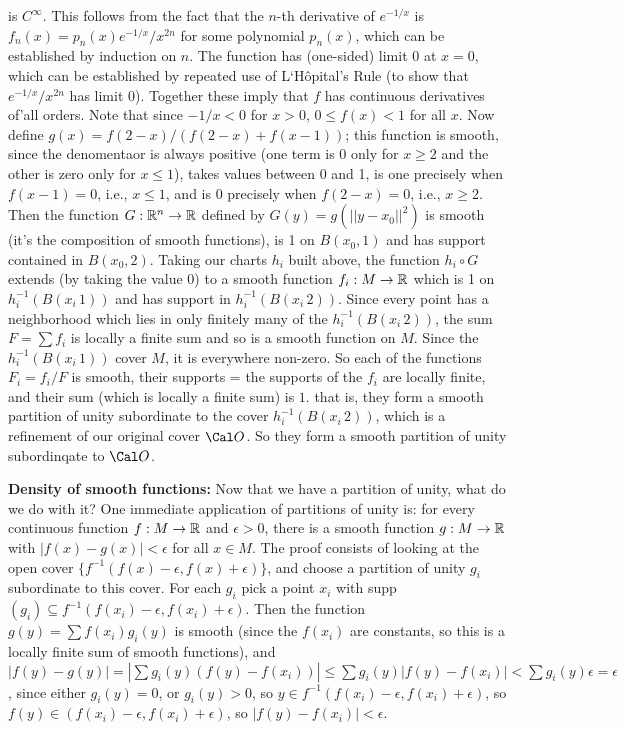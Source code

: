 
\noindent is $C^\infty$. This follows from the fact that the $n$-th derivative of
$e^{-1/x}$ is $f_n(x)=p_n(x)e^{-1/x}/x^{2n}$ for some polynomial $p_n(x)$, which can be established
by induction on $n$. The function has (one-sided) limit $0$ at $x=0$, which can be established by
repeated use of L`H\^opital's Rule (to show that $e^{-1/x}/x^{2n}$ has limit 0). 
Together these imply that $f$ has continuous derivatives of'all orders. Note that since
$-1/x<0$ for $x>0$, $0\leq f(x) <1$ for all $x$. Now define 
$g(x)=f(2-x)/(f(2-x)+f(x-1))$; this function is smooth, since the denomentaor is always positive
(one term is 0 only for $x\geq 2$ and the other is zero only for $x\leq 1$), takes values
between 0 and 1, is one precisely when $f(x-1)=0$, i.e., $x\leq 1$, and is 0 precisely when 
$f(2-x)=0$, i.e., $x\geq 2$. Then the function $G:{\Bbb R}^n\rightarrow {\Bbb R}$ defined by
$G(y)=g(||y-x_0||^2)$ is smooth (it's the composition of smooth functions), is
1 on $B(x_0,1)$ and has support contained in $B(x_0,2)$. Taking our charts $h_i$
built above, the function $h_i\circ G$ extends (by taking the value 0) to a smooth 
function $f_i:M\rightarrow {\Bbb R}$ which is 1 on 
$h_i^{-1}(B(x_i\,1))$ and has support in $h_i^{-1}(B(x_i\,2))$. Since every
point has a neighborhood which lies in only finitely many of the $h_i^{-1}(B(x_i\,2))$,
the sum $F=\sum f_i$ is locally a finite sum and so is a smooth function on $M$.
Since the $h_i^{-1}(B(x_i\,1))$ cover $M$, it is everywhere non-zero. So each 
of the functions $F_i=f_i/F$ is smooth, their supports = the supports of the $f_i$
are locally finite, and their sum (which is locally a finite sum) is $1$. that is,
they form a smooth partition of unity subordinate to the cover
$h_i^{-1}(B(x_i\,2))$, which is a refinement of our original cover $\Cal O$. So they
form a smooth partition of unity subordinqate to $\Cal O$.

\msk

{\bf Density of smooth functions:} Now that we have a partition of unity, what do we do with it?
One immediate application of partitions of unity is: for every continuous function $f:M\rightarrow {\Bbb R}$
and $\epsilon > 0$, there is a smooth function $g:M\rightarrow {\Bbb R}$ with $|f(x)-g(x)|< \epsilon$ 
for all $x\in M$. The proof consists of looking at the open cover $\{f^{-1}(f(x)-\epsilon,f(x)+\epsilon)\}$,
and choose a partition of unity $g_i$ subordinate to this cover. For each $g_i$ pick a point $x_i$ with 
supp$(g_i)\subseteq f^{-1}(f(x_i)-\epsilon,f(x_i)+\epsilon)$. Then the function $g(y)=\sum f(x_i)g_i(y)$ is smooth
(since the $f(x_i)$ are constants, so this is a locally finite sum of smooth functions), and 
$|f(y)-g(y)|=|\sum g_i(y)(f(y)-f(x_i))|\leq \sum g_i(y)|f(y)-f(x_i)| < \sum g_i(y) \epsilon = \epsilon$,
since either $g_i(y)=0$, or $g_i(y)>0$, so $y\in f^{-1}(f(x_i)-\epsilon,f(x_i)+\epsilon)$, so 
$f(y)\in (f(x_i)-\epsilon,f(x_i)+\epsilon)$, so $|f(y)-f(x_i)|<\epsilon$.

